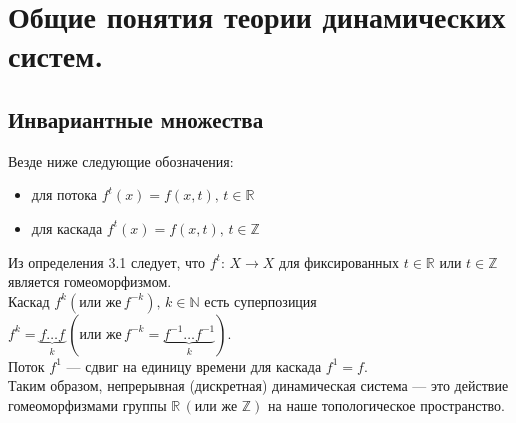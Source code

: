 \chapter{Общие понятия теории динамических систем.}

\section{Инвариантные множества}


\noindent Везде ниже следующие обозначения:
\begin{itemize}
    \item[] для потока \(f^t(x) = f(x, t),\, t \in \mathbb{R}\)
    \item[] для каскада \(f^t(x) = f(x, t),\, t \in  \mathbb{Z}\)
\end{itemize}

\noindent Из определения 3.1 следует, что \(f^t{:}\, X \longrightarrow X\) для фиксированных \(t \in \mathbb{R}\)
или \(t \in \mathbb{Z}\) является гомеоморфизмом.
\\[1mm]
Каскад \(f^k (\text{или же}\, f^{-k}),\, k \in \mathbb{N}\) есть суперпозиция \(f^k = \underbrace{f \dots f}_{k}\, (\text{или же}\, f^{-k} = \underbrace{f^{-1} \dots f^{-1}}_{k})\). 
\\[1mm]
Поток \(f^1\) --- сдвиг на единицу времени для каскада \(f^1 = f\).
\\[1mm]
Таким образом, непрерывная (дискретная) динамическая система --- это действие гомеоморфизмами группы \(\mathbb{R}\, (\text{или же } \mathbb{Z})\) на наше топологическое пространство.


